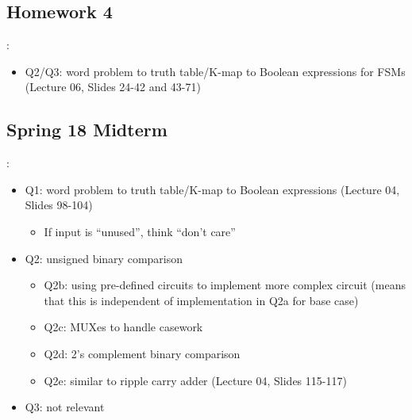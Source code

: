 \documentclass{../slides}
\begin{document}
\subsection{Homework 4}
\begin{frame}{\secname: \subsecname}
    \begin{itemize}
        \item Q2/Q3: word problem to truth table/K-map to Boolean expressions for FSMs (Lecture 06, Slides 24-42 and 43-71)
    \end{itemize}
\end{frame}

\subsection{Spring 18 Midterm}
\begin{frame}{\secname: \subsecname}
    \begin{itemize}
        \item Q1: word problem to truth table/K-map to Boolean expressions (Lecture 04, Slides 98-104)
        \begin{itemize}
            \item If input is \enquote{unused}, think \enquote{don't care}
        \end{itemize}
        \item Q2: unsigned binary comparison
        \begin{itemize}
            \item Q2b: using pre-defined circuits to implement more complex circuit (means that this is independent of implementation in Q2a for base case)
            \item Q2c: MUXes to handle casework
            \item Q2d: 2's complement binary comparison
            \item Q2e: similar to ripple carry adder (Lecture 04, Slides 115-117)
        \end{itemize}
        \item Q3: not relevant
    \end{itemize}
\end{frame}
\end{document}
